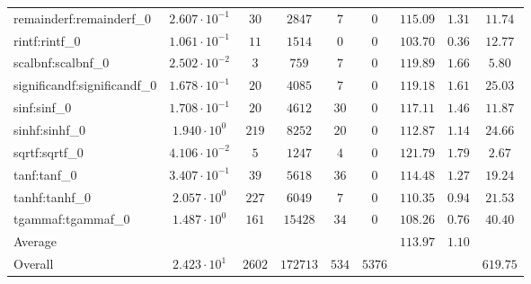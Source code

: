 \begin{tabular}{|l|c|c|c|c|c|c|c|c|}
remainderf:remainderf\_0     & $ 2.607 \cdot 10^{-1} $ & $ 30     $ & $ 2847   $ & $ 7   $ & $ 0    $ & $ 115.09      $ & $ 1.31    $ & $ 11.74   $ \\
rintf:rintf\_0               & $ 1.061 \cdot 10^{-1} $ & $ 11     $ & $ 1514   $ & $ 0   $ & $ 0    $ & $ 103.70      $ & $ 0.36    $ & $ 12.77   $ \\
scalbnf:scalbnf\_0           & $ 2.502 \cdot 10^{-2} $ & $ 3      $ & $ 759    $ & $ 7   $ & $ 0    $ & $ 119.89      $ & $ 1.66    $ & $ 5.80    $ \\
significandf:significandf\_0 & $ 1.678 \cdot 10^{-1} $ & $ 20     $ & $ 4085   $ & $ 7   $ & $ 0    $ & $ 119.18      $ & $ 1.61    $ & $ 25.03   $ \\
sinf:sinf\_0                 & $ 1.708 \cdot 10^{-1} $ & $ 20     $ & $ 4612   $ & $ 30  $ & $ 0    $ & $ 117.11      $ & $ 1.46    $ & $ 11.87   $ \\
sinhf:sinhf\_0               & $ 1.940 \cdot 10^{0}  $ & $ 219    $ & $ 8252   $ & $ 20  $ & $ 0    $ & $ 112.87      $ & $ 1.14    $ & $ 24.66   $ \\
sqrtf:sqrtf\_0               & $ 4.106 \cdot 10^{-2} $ & $ 5      $ & $ 1247   $ & $ 4   $ & $ 0    $ & $ 121.79      $ & $ 1.79    $ & $ 2.67    $ \\
tanf:tanf\_0                 & $ 3.407 \cdot 10^{-1} $ & $ 39     $ & $ 5618   $ & $ 36  $ & $ 0    $ & $ 114.48      $ & $ 1.27    $ & $ 19.24   $ \\
tanhf:tanhf\_0               & $ 2.057 \cdot 10^{0}  $ & $ 227    $ & $ 6049   $ & $ 7   $ & $ 0    $ & $ 110.35      $ & $ 0.94    $ & $ 21.53   $ \\
tgammaf:tgammaf\_0           & $ 1.487 \cdot 10^{0}  $ & $ 161    $ & $ 15428  $ & $ 34  $ & $ 0    $ & $ 108.26      $ & $ 0.76    $ & $ 40.40   $ \\
\hline
Average                      & $                     $ & $        $ & $        $ & $     $ & $      $ & $ 113.97      $ & $ 1.10    $ & $         $ \\
\hline
Overall                      & $ 2.423 \cdot 10^{1}  $ & $ 2602   $ & $ 172713 $ & $ 534 $ & $ 5376 $ & $             $ & $         $ & $ 619.75  $ \\
\hline
\end{tabular}
